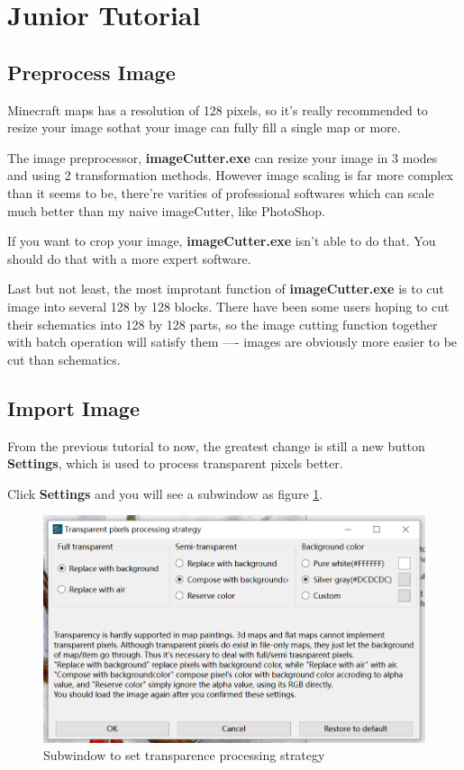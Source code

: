 \documentclass{article}
\begin{document}
    \pagebreak
    \section{Junior Tutorial}

    \subsection{Preprocess Image}
    Minecraft maps has a resolution of 128 pixels, so it's really recommended to resize your image sothat your image can fully fill a single map or more.

    The image preprocessor, \textbf{imageCutter.exe} can resize your image in 3 modes and using 2 transformation methods. However image scaling is far more complex than it seems to be, there're varities of professional softwares which can scale much better than my naive imageCutter, like PhotoShop.

    If you want to crop your image, \textbf{imageCutter.exe} isn't able to do that. You should do that with a more expert software.

    Last but not least, the most improtant function of \textbf{imageCutter.exe} is to cut image into several 128 by 128 blocks. There have been some users hoping to cut their schematics into 128 by 128 parts, so the image cutting function together with batch operation will satisfy them ---- images are obviously more easier to be cut than schematics.

    \subsection{Import Image}
    From the previous tutorial to now, the greatest change is still a new button \textbf{Settings}, which is used to process transparent pixels better.
 
    Click \textbf{Settings} and you will see a subwindow as figure \ref*{SetTPS}.

    \begin{figure}[htbp]
        \centering
        \includegraphics[width=15cm]{Img1_TPS.png}
        \caption{Subwindow to set transparence processing strategy}
        \label{SetTPS}
    \end{figure}
    
\end{document}
